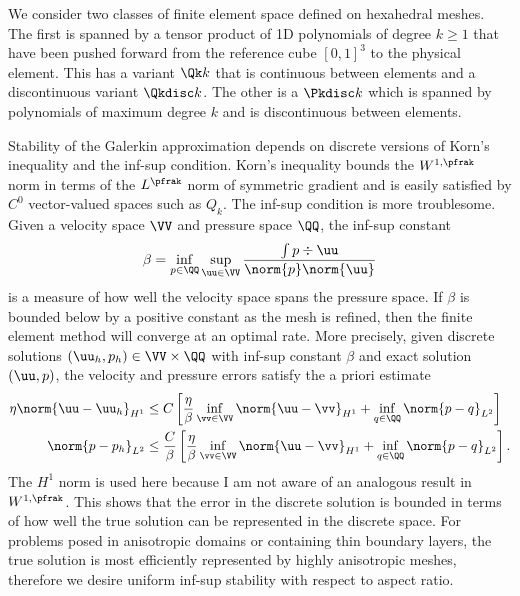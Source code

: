 We consider two classes of finite element space defined on hexahedral meshes.
The first is spanned by a tensor product of 1D polynomials of degree $k \ge 1$ that have been pushed forward from the reference cube $[0,1]^3$ to the physical element.
This has a variant $\Qk k$ that is continuous between elements and a discontinuous variant $\Qkdisc k$.
The other is a $\Pkdisc k$ which is spanned by polynomials of maximum degree $k$ and is discontinuous between elements.

Stability of the Galerkin approximation depends on discrete versions of Korn's inequality and the inf-sup condition.
Korn's inequality bounds the $W^{1,\pfrak}$ norm in terms of the $L^\pfrak$ norm of symmetric gradient and is easily satisfied by $C^0$ vector-valued spaces such as $Q_k$.
The inf-sup condition is more troublesome.
Given a velocity space $\VV$ and pressure space $\QQ$, the inf-sup constant
\begin{equation}\label{eq:slip:inf-sup}
  \beta = \inf_{p\in \QQ} \sup_{\uu\in\VV} \frac{\int p\div\uu}{\norm{p} \norm{\uu}}
\end{equation}
is a measure of how well the velocity space spans the pressure space.
If $\beta$ is bounded below by a positive constant as the mesh is refined, then the finite element method will converge at an optimal rate.
More precisely, given discrete solutions $(\uu_h,p_h) \in \VV \times \QQ$ with inf-sup constant $\beta$ and exact solution $(\uu,p)$, the velocity and pressure errors satisfy the a priori estimate~\citep{brezzi1991mixed}
\begin{align}\label{eq:slip:apriori}
  \eta \norm{\uu - \uu_h}_{H^1} & \le C \left[ \frac{\eta}{\beta} \inf_{\vv \in \VV} \norm{\uu - \vv}_{H^1} + \inf_{q \in \QQ} \norm{p-q}_{L^2} \right] \\
  \norm{p - p_h}_{L^2} & \le \frac{C}{\beta} \left[ \frac{\eta}{\beta} \inf_{\vv \in \VV} \norm{\uu - \vv}_{H^1} + \inf_{q\in\QQ} \norm{p-q}_{L^2} \right] .
\end{align}
The $H^1$ norm is used here because I am not aware of an analogous result in $W^{1,\pfrak}$.
This shows that the error in the discrete solution is bounded in terms of how well the true solution can be represented in the discrete space.
For problems posed in anisotropic domains or containing thin boundary layers, the true solution is most efficiently represented by highly anisotropic meshes, therefore we desire uniform inf-sup stability with respect to aspect ratio.

